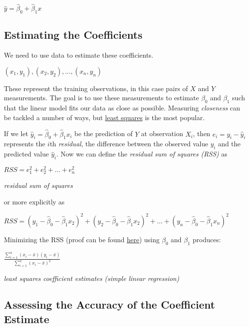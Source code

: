\documentclass[]{book}
\begin{document}
\(\hat y = \hat\beta_0 + \hat\beta_1x\)

\hypertarget{estimating-the-coefficients}{%
\subsection{Estimating the Coefficients}\label{estimating-the-coefficients}}

We need to use data to estimate these coefficients.

\((x_1,y_1), (x_2,y_2),..., (x_n,y_n)\)

These represent the training observations, in this case pairs of \(X\) and \(Y\) measurements. The goal is to use these measurements to estimate \(\beta_0\) and \(\beta_1\) such that the linear model fits our data as close as possible. Measuring \emph{closeness} can be tackled a number of ways, but \href{https://en.wikipedia.org/wiki/Least_squares}{least squares} is the most popular.

If we let \(\hat y_i = \hat\beta_0 + \hat\beta_1x_i\) be the prediction of \(Y\) at observation \(X_i\), then \(e_i = y_i - \hat y_i\) represents the \(i\)th \emph{residual}, the difference between the observed value \(y_i\) and the predicted value \(\hat y_i\). Now we can define the \emph{residual sum of squares (RSS)} as

\(RSS = e_1^2 + e_2^2 + ... + e_n^2\)

\emph{residual sum of squares}

or more explicitly as

\(RSS = (y_1 - \hat\beta_0 - \hat\beta_1x_2)^2 + (y_2 - \hat\beta_0 - \hat\beta_1x_2)^2 + ... + (y_n - \hat\beta_0 - \hat\beta_1x_n)^2\)

Minimizing the RSS (proof can be found \href{https://en.m.wikipedia.org/wiki/Simple_linear_regression\#Derivation_of_simple_regression_estimators}{here}) using \(\beta_0\) and \(\beta_1\) produces:

\(\frac{\displaystyle \sum_{i=1}^{n}(x_i-\bar x)(y_i - \bar x)}{\displaystyle\sum_{i=1}^{n}(x_i - \bar x)^2}\)

\emph{least squares coefficient estimates (simple linear regression)}

\hypertarget{assessing-the-accuracy-of-the-coefficient-estimate}{%
\subsection{Assessing the Accuracy of the Coefficient Estimate}\label{assessing-the-accuracy-of-the-coefficient-estimate}}
\end{document}
